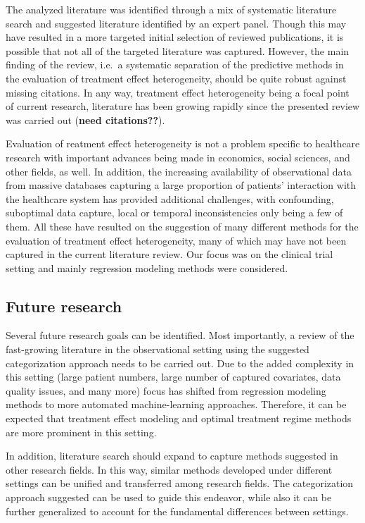 \documentclass[
]{book}
\begin{document}
The analyzed literature was identified through a mix of systematic literature
search and suggested literature identified by an expert panel. Though this may
have resulted in a more targeted initial selection of reviewed publications, it
is possible that not all of the targeted literature was captured. However, the
main finding of the review, i.e.~a systematic separation of the predictive
methods in the evaluation of treatment effect heterogeneity, should be quite
robust against missing citations. In any way, treatment effect heterogeneity
being a focal point of current research, literature has been growing rapidly
since the presented review was carried out (\textbf{need citations??}).

Evaluation of reatment effect heterogeneity is not a problem specific to
healthcare research with important advances being made in economics, social
sciences, and other fields, as well. In addition, the increasing availability of
observational data from massive databases capturing a large proportion of
patients' interaction with the healthcare system has provided additional
challenges, with confounding, suboptimal data capture, local or temporal
inconsistencies only being a few of them. All these have resulted on the
suggestion of many different methods for the evaluation of treatment effect
heterogeneity, many of which may have not been captured in the current literature
review. Our focus was on the clinical trial setting and mainly regression
modeling methods were considered.

\hypertarget{future-research}{%
\subsection{Future research}\label{future-research}}

Several future research goals can be identified. Most importantly, a review of
the fast-growing literature in the observational setting using the suggested
categorization approach needs to be carried out. Due to the added complexity in
this setting (large patient numbers, large number of captured covariates, data
quality issues, and many more) focus has shifted from regression modeling
methods to more automated machine-learning approaches. Therefore, it can be
expected that treatment effect modeling and optimal treatment regime methods are
more prominent in this setting.

In addition, literature search should expand to capture methods suggested in
other research fields. In this way, similar methods developed under different
settings can be unified and transferred among research fields. The
categorization approach suggested can be used to guide this endeavor, while also
it can be further generalized to account for the fundamental differences between
settings.
\end{document}

